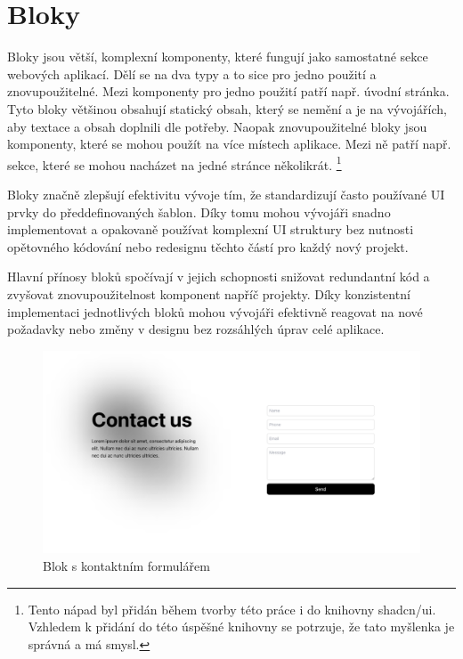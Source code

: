 \clearpage

\section{Bloky}
Bloky jsou větší, komplexní komponenty, které fungují jako samostatné sekce webových aplikací. Dělí se na dva typy a to sice pro jedno použití a znovupoužitelné. Mezi komponenty pro jedno použití patří např. úvodní stránka. Tyto bloky většinou obsahují statický obsah, který se nemění a je na vývojářích, aby textace a obsah doplnili dle potřeby. Naopak znovupoužitelné bloky jsou komponenty, které se mohou použít na více místech aplikace. Mezi ně patří např. sekce, které se mohou nacházet na jedné stránce několikrát. \footnote{Tento nápad byl přidán během tvorby této práce i do knihovny shadcn/ui. Vzhledem k přidání do této úspěšné knihovny se potrzuje, že tato myšlenka je správná a má smysl.}

Bloky značně zlepšují efektivitu vývoje tím, že standardizují často používané UI prvky do předdefinovaných šablon. Díky tomu mohou vývojáři snadno implementovat a opakovaně používat komplexní UI struktury bez nutnosti opětovného kódování nebo redesignu těchto částí pro každý nový projekt.

Hlavní přínosy bloků spočívají v jejich schopnosti snižovat redundantní kód a zvyšovat znovupoužitelnost komponent napříč projekty. Díky konzistentní implementaci jednotlivých bloků mohou vývojáři efektivně reagovat na nové požadavky nebo změny v designu bez rozsáhlých úprav celé aplikace.

\begin{figure}[H]
  \includegraphics[width=\textwidth]{images/block-contact}
  \caption{Blok s kontaktním formulářem} \label{picture:block-contact}
\end{figure}

